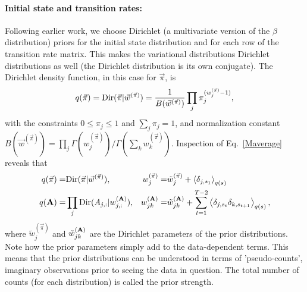 \paragraph{Initial state and transition rates:}
Following earlier work\cite{Mackay1997,Beal2003,Bronson2009}, we
choose Dirichlet (a multivariate version of the $\beta$ distribution) priors for the initial state distribution and for
each row of the transition rate matrix\cite{wiki:dirichlet}. This
makes the variational distributions Dirichlet distributions as well
(the Dirichlet distribution is its own conjugate). The Dirichlet
density function, in this case for $\vec\pi$, is
\begin{equation}\label{eq:p0pi}
        q(\vec\pi)=\text{Dir}(\vec\pi|\vec{w}^{(\vec{\pi})})=\frac{1}{B(\vec w^{(\vec\pi)})}\prod_j \pi_j^{(w_j^{(\vec\pi)}-1)},
\end{equation}
with the constraints $0\le \pi_j\le1$ and $\sum_j\pi_j=1$, and
normalization constant $B(\vec
w^{(\vec\pi)})=\prod_j\Gamma(w_j^{(\vec\pi)})/\Gamma(\sum_kw_k^{(\vec\pi)})$\cite{wiki:dirichlet}. Inspection
of Eq.~\eqref{Maverage} reveals that
\begin{align}\label{VBM_pi}
  q(\vec{\pi})=&\text{Dir}(\vec{\pi}|\vec{w}^{(\vec{\pi})}),&
  w_j^{(\vec{\pi})}=&\tilde w_j^{(\vec{\pi})}+\left\langle \delta_{j,s_1}\right\rangle_{q(s)}
\\
\label{VBM_A}
  q(\mathbf{A})=&\prod_j
  \text{Dir}(A_{j,:}|w_{j,:}^{(\mathbf{A})}),&
  w_{jk}^{(\mathbf{A})}=&\tilde w_{jk}^{(\mathbf{A})}
  +\sum_{t=1}^{T-2}\left\langle \delta_{j,s_t}\delta_{k,s_{t+1}}\right\rangle_{q(s)},
\end{align}
where $\tilde w_j^{(\vec{\pi})}$ and $\tilde w_{jk}^{(\mathbf{A})}$
are the Dirichlet parameters of the prior distributions. Note how the
prior parameters simply add to the data-dependent terms. This means
that the prior distributions can be understood in terms of
'pseudo-counts', imaginary observations prior to seeing the data in
question. The total number of counts (for each distribution) is called
the prior strength.

